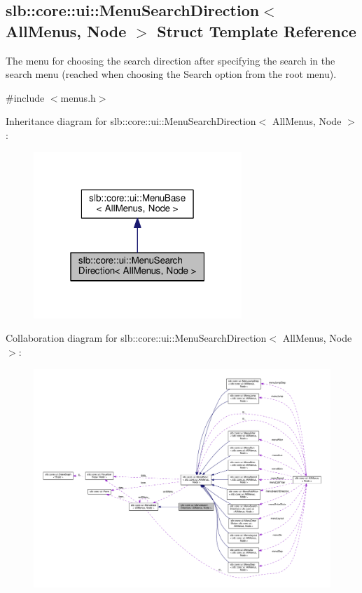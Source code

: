 \hypertarget{structslb_1_1core_1_1ui_1_1MenuSearchDirection}{}\subsection{slb\+:\+:core\+:\+:ui\+:\+:Menu\+Search\+Direction$<$ All\+Menus, Node $>$ Struct Template Reference}
\label{structslb_1_1core_1_1ui_1_1MenuSearchDirection}


The menu for choosing the search direction after specifying the search in the search menu (reached when choosing the Search option from the root menu).  




{\ttfamily \#include $<$menus.\+h$>$}



Inheritance diagram for slb\+:\+:core\+:\+:ui\+:\+:Menu\+Search\+Direction$<$ All\+Menus, Node $>$\+:\nopagebreak
\begin{figure}[H]
\begin{center}
\leavevmode
\includegraphics[width=223pt]{structslb_1_1core_1_1ui_1_1MenuSearchDirection__inherit__graph}
\end{center}
\end{figure}


Collaboration diagram for slb\+:\+:core\+:\+:ui\+:\+:Menu\+Search\+Direction$<$ All\+Menus, Node $>$\+:\nopagebreak
\begin{figure}[H]
\begin{center}
\leavevmode
\includegraphics[width=350pt]{structslb_1_1core_1_1ui_1_1MenuSearchDirection__coll__graph}
\end{center}
\end{figure}
